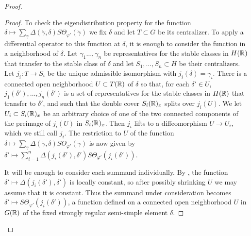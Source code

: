 \documentclass{article}
\theoremstyle{definition}
\numberwithin{equation}{section}
\renewcommand{\-}{\hyp{}}
\begin{document}
\begin{proof}
\begin{proof}
		To check the eigendistribution property for the function $\delta \mapsto \sum_\gamma \Delta(\dot\gamma,\delta)S\Theta_{\varphi'}(\dot\gamma)$ we fix $\delta$ and let $T \subset G$ be its centralizer. To apply a differential operator to this function at $\delta$, it is enough to consider the function in a neighborhood of $\delta$. Let $\gamma_1\dots,\gamma_n$ be representatives for the stable classes in $H(\mathbb{R})$ that transfer to the stable class of $\delta$ and let $S_1,\dots,S_n \subset H$ be their centralizers. Let $j_i : T \to S_i$ be the unique admissible isomorphism with $j_i(\delta)=\gamma_i$. There is a connected open neighborhood $U \subset T(\mathbb{R})$ of $\delta$ so that, for each $\delta' \in U$, $j_1(\delta'),\dots,j_n(\delta')$ is a set of representatives for the stable classes in $H(\mathbb{R})$ that transfer to $\delta'$, and such that the double cover $S_i(\mathbb{R})_x$ splits over $j_i(U)$. We let $U_i \subset S_i(\mathbb{R})_x$ be an arbitrary choice of one of the two connected components of the preimage of $j_i(U)$ in $S_i(\mathbb{R})_x$. Then $j_i$ lifts to a diffeomorphism $U \to U_i$, which we still call $j_i$. The restriction to $U$ of the function $\delta \mapsto \sum_\gamma \Delta(\dot\gamma,\delta)S\Theta_{\varphi'}(\dot\gamma)$ is now given by $\delta' \mapsto \sum_{i=1}^n \Delta(j_i(\delta'),\delta')S\Theta_{\varphi'}(j_i(\delta'))$. 
		
		It will be enough to consider each summand individually. By \cite[Corollary 4.3.4]{KalHDC}, the function $\delta' \mapsto \Delta(j_i(\delta'),\delta')$ is locally constant, so after possibly shrinking $U$ we may assume that it is constant. Thus the summand under consideration becomes $\delta' \mapsto S\Theta_{\varphi'}(j_i(\delta'))$, a function defined on a connected open neighborhood $U$ in $G(\mathbb{R})$ of the fixed strongly regular semi-simple element $\delta$.


\end{proof}
\end{proof}
\end{document}
